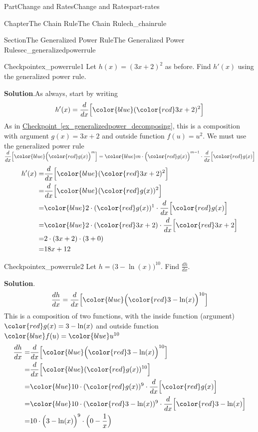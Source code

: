 \documentclass[oneside,10pt,]{tufte-book}
\newcommand{\blocktitlefont}{\relax}
\newcommand{\xreffont}{\relax}
\numberwithin{equation}{chapter}
\newcommand{\red}[1]{   {\color{red}   #1}   }
\newcommand{\blue}[1]{  {\color{blue}  #1}  }
\newcommand{\ddx}[1]{ \dfrac{d}{dx} \Big[ #1 \Big]  }
\newcommand{\amp}{&}
\begin{document}
\begin{partptx}{Part}{Change and Rates}{}{Change and Rates}{}{}{part-rates}
\begin{chapterptx}{Chapter}{The Chain Rule}{}{The Chain Rule}{}{}{ch_chainrule}
\begin{sectionptx}{Section}{The Generalized Power Rule}{}{The Generalized Power Rule}{}{}{sec_generalizedpowerrule}
\begin{inlineexercise}{Checkpoint}{}{ex_powerrule1}
Let \(h(x) = (3x+2)^2\) as before.  Find \(h'(x)\) using the generalized power rule.%
\par\smallskip%
\noindent\textbf{\blocktitlefont Solution}.\hypertarget{ex_powerrule1-2}{}\quad{}As always, start by writing%
\begin{equation*}
h'(x) = \ddx{ \blue{(\red{3x+2})^2} } 
\end{equation*}
As in \hyperref[ex_generalizedpower_decomposing]{Checkpoint~{\xreffont\ref{ex_generalizedpower_decomposing}}}, this is a composition with argument \(g(x) = 3x+2\) and outside function \(f(u) = u^2\). We must use the generalized power rule \(\ddx{ \blue{ \Big( \red{g(x)} \Big)^m}} = \blue{ m\cdot \Big( \red{g(x)} \Big)^{m-1} } \cdot \ddx{\red{g(x)}} \)%
\begin{align*}
h'(x) = \amp \ddx{ \blue{ ( \red{3x+2} )^2 } }\\
= \amp \ddx{\blue{ ( \red{g(x)} )^2 } } \\
= \amp \blue{ 2\cdot ( \red{g(x)} )^1 }\cdot \ddx{ \red{g(x)} }\\
= \amp \blue{2\cdot ( \red{3x+2} ) }\cdot \ddx{ \red{3x+2} }\\
= \amp 2\cdot (3x+2) \cdot (3+0)\\
= \amp 18x+12
\end{align*}
%
\end{inlineexercise}%
\begin{inlineexercise}{Checkpoint}{}{ex_powerrule2}%
Let \(h = \Big(3-\ln(x)\Big)^{10}\). Find \(\frac{dh}{dx}\).%
\par\smallskip%
\noindent\textbf{\blocktitlefont Solution}.\hypertarget{ex_powerrule2-2}{}\quad{}%
\begin{equation*}
\frac{dh}{dx} = \ddx{ \blue{ \Big( \red{3-\ln(x)}\Big)^{10} } } 
\end{equation*}
This is a composition of two functions, with the inside function (argument) \(\red{g(x) = 3-\ln(x)} \) and outside function \(\blue{f(u)} = \blue {u^{10}}\)%
\begin{align*}
\frac{dh}{dx} =  \amp \ddx{ \blue{ \Big( \red{3-\ln(x)}\Big)^{10} } } \\
= \amp \ddx{\blue{ ( \red{g(x)} )^{10} } } \\
= \amp \blue{ 10\cdot ( \red{g(x)} )^9 }\cdot \ddx{ \red{g(x)} }\\
= \amp \blue{10\cdot ( \red{3-\ln(x)} )^9 }\cdot \ddx{ \red{3-\ln(x)} }\\
= \amp 10\cdot \Big(3-\ln(x)\Big)^9\cdot \Big( 0 - \frac{1}{x}\Big)\\

\end{align*}
\end{inlineexercise}
\end{sectionptx}
\end{chapterptx}
\end{partptx}
\end{document}
